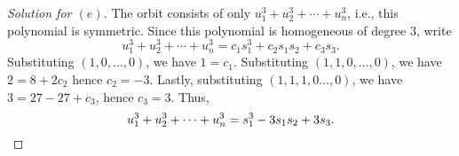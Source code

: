 \documentclass[12pt]{article}
\theoremstyle{remark}
\begin{document}
\begin{proof}[Solution for $(e)$]
  The orbit consists of only $u_1^3 + u_2^3 + \cdots + u_n^3$, i.e., this polynomial is symmetric. Since this polynomial is homogeneous of degree $3$, write
  \begin{equation*}
    u_1^3 + u_2^3 + \cdots + u_n^3 = c_1s_1^3 + c_2s_1s_2 + c_3s_3.
  \end{equation*}
  Substituting $(1,0,\ldots,0)$, we have $1 = c_1$. Substituting $(1,1,0,\ldots,0)$, we have $2 = 8 + 2c_2$ hence $c_2 = -3$. Lastly, substituting $(1,1,1,0\ldots,0)$, we have $3 = 27 - 27 + c_3$, hence $c_3 = 3$. Thus,
  \begin{equation*}
    u_1^3 + u_2^3 + \cdots + u_n^3 = s_1^3 - 3s_1s_2 + 3s_3.\qedhere
  \end{equation*}
\end{proof}
\end{document}
